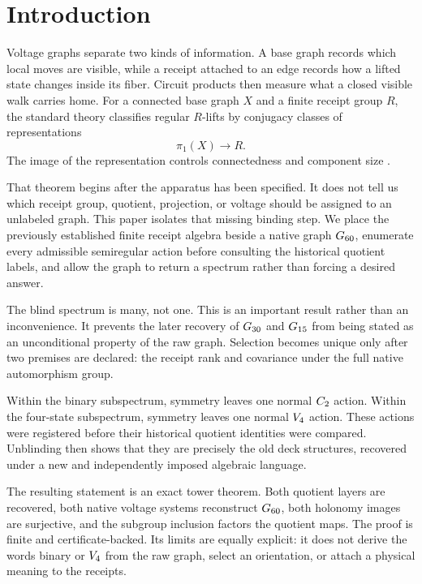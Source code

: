 \section{Introduction}

Voltage graphs separate two kinds of information.  A base graph records
which local moves are visible, while a receipt attached to an edge
records how a lifted state changes inside its fiber.  Circuit products
then measure what a closed visible walk carries home.  For a connected
base graph \(X\) and a finite receipt group \(R\), the standard theory
classifies regular \(R\)-lifts by conjugacy classes of representations
\[
  \pi_1(X)\longrightarrow R.
\]
The image of the representation controls connectedness and component
size \cite{gross-tucker,godsil-royle}.

That theorem begins after the apparatus has been specified.  It does
not tell us which receipt group, quotient, projection, or voltage should
be assigned to an unlabeled graph.  This paper isolates that missing
binding step.  We place the previously established finite receipt
algebra beside a native graph \(G_{60}\), enumerate every admissible
semiregular action before consulting the historical quotient labels,
and allow the graph to return a spectrum rather than forcing a desired
answer.

The blind spectrum is many, not one.  This is an important result
rather than an inconvenience.  It prevents the later recovery of
\(G_{30}\) and \(G_{15}\) from being stated as an unconditional
property of the raw graph.  Selection becomes unique only after two
premises are declared: the receipt rank and covariance under the full
native automorphism group.

Within the binary subspectrum, symmetry leaves one normal \(C_{2}\)
action.  Within the four-state subspectrum, symmetry leaves one normal
\(V_{4}\) action.  These actions were registered before their
historical quotient identities were compared.  Unblinding then shows
that they are precisely the old deck structures, recovered under a new
and independently imposed algebraic language.

The resulting statement is an exact tower theorem.  Both quotient
layers are recovered, both native voltage systems reconstruct
\(G_{60}\), both holonomy images are surjective, and the subgroup
inclusion factors the quotient maps.  The proof is finite and
certificate-backed.  Its limits are equally explicit: it does not
derive the words binary or \(V_{4}\) from the raw graph, select an
orientation, or attach a physical meaning to the receipts.
